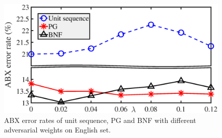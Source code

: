 \documentclass[a4paper]{article}
\begin{document}
\begin{figure}
    \centering
    \includegraphics[width=0.6\linewidth]{adv_results2_zs19_export_setup.eps}
    \caption{ABX error rates of unit sequence, PG and BNF with different adversarial weights on English set.}
    \label{fig:adv_results_zs19}
\end{figure}


\end{document}
